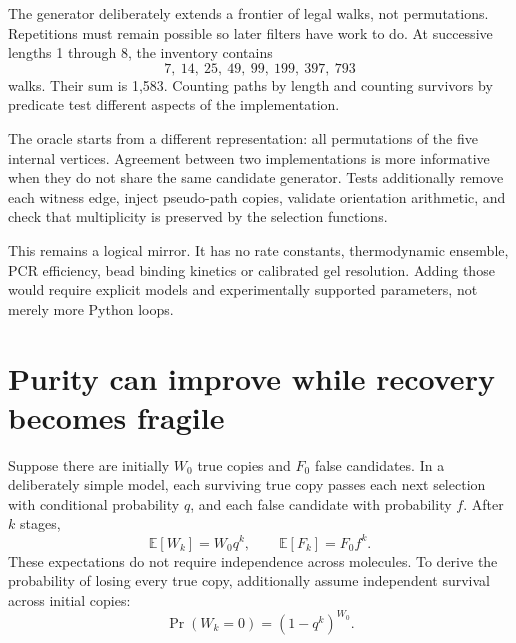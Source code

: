 \begin{minipage}{\linewidth}
\end{minipage}

The generator deliberately extends a frontier of legal walks, not permutations. Repetitions must remain possible so later filters have work to do. At successive lengths 1 through 8, the inventory contains
\[
7,\ 14,\ 25,\ 49,\ 99,\ 199,\ 397,\ 793
\]
walks. Their sum is 1,583. Counting paths by length and counting survivors by predicate test different aspects of the implementation.


The oracle starts from a different representation: all permutations of the five internal vertices. Agreement between two implementations is more informative when they do not share the same candidate generator. Tests additionally remove each witness edge, inject pseudo-path copies, validate orientation arithmetic, and check that multiplicity is preserved by the selection functions.

This remains a logical mirror. It has no rate constants, thermodynamic ensemble, PCR efficiency, bead binding kinetics or calibrated gel resolution. Adding those would require explicit models and experimentally supported parameters, not merely more Python loops.

\section{Purity can improve while recovery becomes fragile}
Suppose there are initially $W_0$ true copies and $F_0$ false candidates. In a deliberately simple model, each surviving true copy passes each next selection with conditional probability $q$, and each false candidate with probability $f$. After $k$ stages,
\[
\mathbb E[W_k]=W_0q^k,\qquad
\mathbb E[F_k]=F_0f^k.
\]
These expectations do not require independence across molecules. To derive the probability of losing every true copy, additionally assume independent survival across initial copies:
\begin{equation}
\Pr(W_k=0)=(1-q^k)^{W_0}.
\label{eq:d2loss}
\end{equation}



